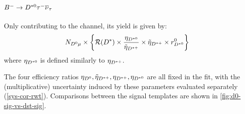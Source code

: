 \paragraph{${{{B}^-}} \rightarrow {\ensuremath{{D}^{*0}}}{\ensuremath{\tau^-}}{\ensuremath{{\overline{\nu}}_\tau}}$}
Only contributing to the \Dz channel, its yield is given by:
\begin{equation}
    N_{{{D}^0}{\mu}} \times \left\{
        \mathcal{R}(D^{*}) \times \frac{\eta_{{{D}^{*0}}}}{\tilde{\eta}_{{{D}^{*+}}}} \times \tilde{\eta}_{{{D}^{*+}}} \times r_{{{D}^{*0}}}^{0}
    \right\}
\end{equation}
where $\eta_{{{D}^{*0}}}$ is defined similarly to $\eta_{{{D}^{*+}}}$.

The four efficiency ratios
$\eta_{{{D}^0}}, \tilde{\eta}_{{{D}^{*+}}}, \eta_{{{D}^{*+}}}, \eta_{{{D}^{*0}}}$
are all fixed in the fit,
with the (multiplicative) uncertainty induced by these
parameters evaluated separately (\cref{sys-cor-rwt}).
Comparisons between the signal templates are shown in
\cref{fig:d0-sig-vs-dst-sig}.


